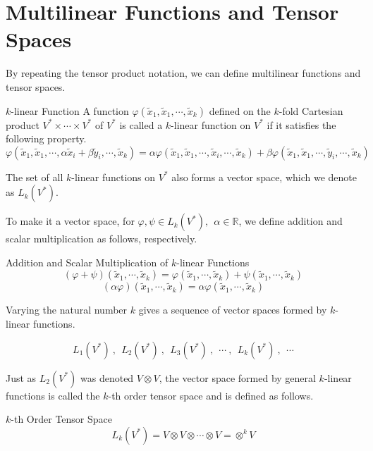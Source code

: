 \documentclass[uplatex,a4j,12pt,dvipdfmx]{jsarticle}
\begin{document}
\section{Multilinear Functions and Tensor Spaces}

By repeating the tensor product notation, we can define multilinear functions and tensor spaces.

\begin{itembox}[l]{$k$-linear Function}
	A function $\varphi(\tilde{x}_{1}, \tilde{x}_{1}, \cdots , \tilde{x}_{k})$
	defined on the $k$-fold Cartesian product $V^{*} \times \cdots \times V^{*}$ of $V^{*}$
	is called a $k$-linear function on $V^{*}$
	if it satisfies the following property.
	$$
		\varphi(\tilde{x}_{1}, \tilde{x}_{1}, \cdots , \alpha \tilde{x}_{i} + \beta \tilde{y}_{i} , \cdots , \tilde{x}_{k})
		=
		\alpha \varphi(\tilde{x}_{1}, \tilde{x}_{1}, \cdots , \tilde{x}_{i} , \cdots , \tilde{x}_{k})
		+
		\beta \varphi(\tilde{x}_{1}, \tilde{x}_{1}, \cdots , \tilde{y}_{i} , \cdots , \tilde{x}_{k})
	$$
\end{itembox}

The set of all $k$-linear functions on $V^{*}$ also forms a vector space,
which we denote as
$L_{k}(V^{*})$.

To make it a vector space,
for $\varphi, \psi \in L_{k}(V^{*}) , \ \ \alpha \in \mathbb{R}$,
we define addition and scalar multiplication as follows, respectively.

\begin{itembox}[l]{Addition and Scalar Multiplication of $k$-linear Functions}
	$$
		( \varphi + \psi ) ( \tilde{x}_{1} , \cdots, \tilde{x}_{k})
		=
		\varphi ( \tilde{x}_{1} , \cdots, \tilde{x}_{k})
		+
		\psi ( \tilde{x}_{1} , \cdots, \tilde{x}_{k})
	$$
	$$
		( \alpha  \varphi ) ( \tilde{x}_{1} , \cdots, \tilde{x}_{k})
		=
		\alpha \varphi ( \tilde{x}_{1} , \cdots, \tilde{x}_{k})
	$$
\end{itembox}

Varying the natural number $k$ gives a sequence of vector spaces formed by $k$-linear functions.

$$
	L_{1}(V^{*}) \ , \ \ L_{2}(V^{*}) \ , \ \ L_{3}(V^{*}) \ , \ \ \cdots \ , \ \ L_{k}(V^{*}) \ , \ \ \cdots
$$

Just as $L_{2}(V^{*})$ was denoted $V \otimes V$, the vector space formed by general $k$-linear functions
is called the $k$-th order tensor space and is defined as follows.

\begin{itembox}[l]{$k$-th Order Tensor Space}
	$$L_{k}(V^{*}) = V \otimes V \otimes \cdots \otimes V = \otimes^{k} V$$
\end{itembox}
\end{document}
